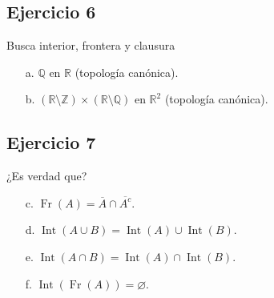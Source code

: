 \documentclass[12pt,a4paper]{article}
\begin{document}
\subsection*{Ejercicio 6}
Busca interior, frontera y clausura
\begin{enumerate}
    \item[a.] $\mathbb{Q}$ en $\mathbb{R}$ (topología canónica).
    \item[b.] $(\mathbb{R}\setminus\mathbb{Z})\times(\mathbb{R}\setminus\mathbb{Q})$ en $\mathbb{R}^2$ (topología canónica).
\end{enumerate}

\vspace{10cm}

\subsection*{Ejercicio 7}
¿Es verdad que?
\begin{enumerate}
    \item[c.] $\operatorname{Fr}(A)=\overline{A}\cap\overline{A^c}$.
    \item[d.] $\operatorname{Int}(A\cup B)=\operatorname{Int}(A)\cup\operatorname{Int}(B)$.
    \item[e.] $\operatorname{Int}(A\cap B)=\operatorname{Int}(A)\cap\operatorname{Int}(B)$.
    \item[f.] $\operatorname{Int}(\operatorname{Fr}(A))=\varnothing$.
\end{enumerate}

\vspace{10cm}
\end{document}
